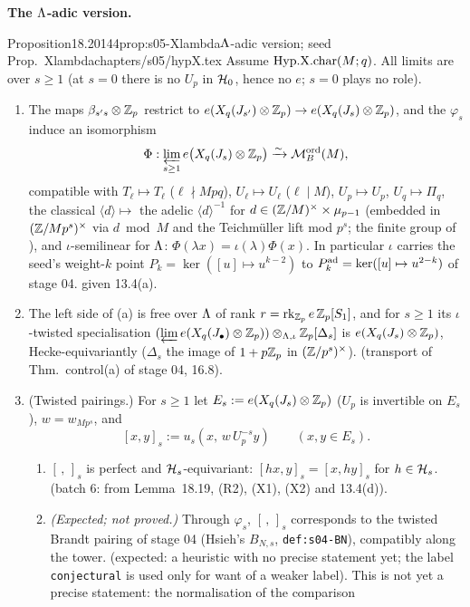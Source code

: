 \medskip\noindent\textbf{The $\Lambda$-adic version.}\par
\begin{quoted}{Proposition}{18.20}{144}{prop:s05-Xlambda}{$\Lambda$-adic version; seed Prop.~Xlambda}{chapters/s05/hypX.tex}\label{rpt:prop:s05-Xlambda}
Assume $\mathrm{Hyp.X.char}(M;q)$. All limits are over $s\ge1$ (at $s=0$ there is no $U_p$ in $\mathcal{H}_0$, hence no $e$; $s=0$ plays no role).
\begin{enumerate}[label=(\alph*)]
\item The maps $\beta_{s's}\otimes\mathbb{Z}_p$ restrict to $e(X_q(J_{s'})\otimes\mathbb{Z}_p)\to e(X_q(J_s)\otimes\mathbb{Z}_p)$, and the $\varphi_s$ induce an isomorphism
  \[\Phi:\varprojlim_{s\ge1}e\big(X_q(J_s)\otimes\mathbb{Z}_p\big)\xrightarrow{\sim}\mathcal{M}^{\mathrm{ord}}_B(M),\]
  compatible with $T_\ell\mapsto T_\ell$ ($\ell\nmid Mpq$), $U_\ell\mapsto U_\ell$ ($\ell\mid M$), $U_p\mapsto U_p$, $U_q\mapsto\Pi_q$, the classical
  $\langle d\rangle\mapsto$ the adelic $\langle d\rangle^{-1}$ for $d\in(\mathbb{Z}/M)^\times\times\mu_{p-1}$ (embedded in $(\mathbb{Z}/Mp^s)^\times$ via $d\bmod M$ and the
  Teichmüller lift mod $p^s$; the finite group of ), and $\iota$-semilinear for $\Lambda$: $\Phi(\lambda x)=\iota(\lambda)\Phi(x)$.
  In particular $\iota$ carries the seed's weight-$k$ point $P_k=\ker([u]\mapsto u^{k-2})$ to $P^{\rm ad}_k=\ker([u]\mapsto u^{2-k})$ of stage 04.
  \stproved{} given 13.4(a).
\item The left side of (a) is free over $\Lambda$ of rank $r=\operatorname{rk}_{\mathbb{Z}_p}e\,\mathbb{Z}_p[S_1]$, and for $s\ge1$ its $\iota$-twisted specialisation
  $(\varprojlim e(X_q(J_\bullet)\otimes\mathbb{Z}_p))\otimes_{\Lambda,\iota}\mathbb{Z}_p[\Delta_s]$ is $e(X_q(J_s)\otimes\mathbb{Z}_p)$, Hecke-equivariantly
  ($\Delta_s$ the image of $1+p\mathbb{Z}_p$ in $(\mathbb{Z}/p^s)^\times$). \stpmc{} (transport of Thm.~control(a) of stage 04, 16.8).
\item (Twisted pairings.) For $s\ge1$ let $E_s:=e(X_q(J_s)\otimes\mathbb{Z}_p)$ ($U_p$ is invertible on $E_s$), $w=w_{Mp^s}$, and
  \[[x,y]_s:=u_s(x,\,w\,U_p^{-s}y)\qquad(x,y\in E_s).\]
  \begin{enumerate}[label=(c\arabic*)]
  \item $[\,,\,]_s$ is perfect and $\mathcal{H}_s$-equivariant: $[hx,y]_s=[x,hy]_s$ for $h\in\mathcal{H}_s$. \stpmc{} (batch 6: from Lemma~18.19, (R2), (X1), (X2) and
    13.4(d)).
  \item \emph{(Expected; not proved.)} Through $\varphi_s$, $[\,,\,]_s$ corresponds to the twisted Brandt pairing of stage 04 (Hsieh's $B_{N,s}$,
    \texttt{def:s04-BN}), compatibly along the tower. \stopen{} (expected: a heuristic with no precise statement yet; the label \texttt{conjectural} is used only for want of a weaker label). This is not yet a precise statement: the normalisation of the comparison

\end{enumerate}
\end{enumerate}
\end{quoted}
